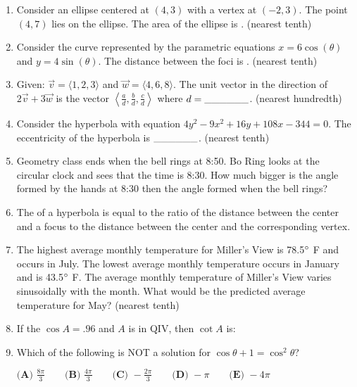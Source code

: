 \documentclass[../uilmath.tex]{subfiles}
\begin{document}
\begin{enumerate}[label=\bfseries\arabic*.]
    \item %
    Consider an ellipse centered at $(4,3)$ with a vertex at $(-2,3)$. The point $(4,7)$ lies on the ellipse.
    The area of the ellipse is \blank. (nearest tenth)

    \item %
    Consider the curve represented by the parametric equations $x=6\cos(\theta)$ and $y=4\sin(\theta)$. The 
    distance between the foci is \blank. (nearest tenth)

    \item %
    Given: $\vec{v}=\langle 1,2,3 \rangle$ and $\vec{w}=\langle 4,6,8\rangle$. The unit vector in the direction of 
    $2\vec{v}+3\vec{w}$ is the vector $\left\langle \frac{a}{d}, \frac{b}{d}, \frac{c}{d}\right\rangle$ where $d=\_\_\_\_\_\_$. (nearest hundredth)

    \item %
    Consider the hyperbola with equation $4y^2-9x^2+16y+108x-344=0$. The eccentricity of the hyperbola is $\_\_\_\_\_\_$. (nearest tenth)

    \item %
    Geometry class ends when the bell rings at 8:50. Bo Ring looks at the circular clock and sees that the time is 8:30. How much bigger is the angle formed 
    by the hands at 8:30 then the angle formed when the bell rings?

    \item %
    The \blank of a hyperbola is equal to the ratio of the distance between the center and a focus 
    to the distance between the center and the corresponding vertex.

    \item %
    The highest average monthly temperature for Miller's View is 78.5$\degree$ F and occurs in July. The lowest average 
    monthly temperature occurs in January and is 43.5$\degree$ F. The average monthly temperature 
    of Miller's View varies sinusoidally with the month. What would be the predicted average temperature for May? (nearest tenth)

    \item %
    If the $\cos A = .96$ and $A$ is in QIV, then $\cot A$ is: 

    \item %
    Which of the following is NOT a solution for $\cos\theta + 1 =\cos^2\theta$?

    $\textbf{(A) } \frac{8\pi}{3} \qquad \textbf{(B) } \frac{4\pi}{3} \qquad \textbf{(C) } -\frac{2\pi}{3} \qquad \textbf{(D) } -\pi \qquad \textbf{(E) } -4\pi$


\end{enumerate}
\end{document}
